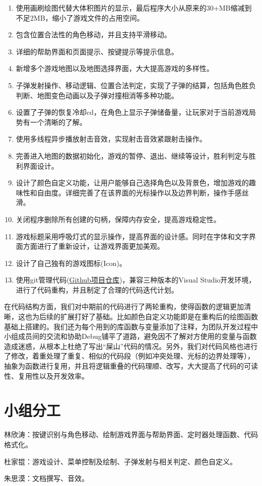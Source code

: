 \documentclass[lang=cn,11pt,a4paper]{elegantpaper}
\begin{document}
\begin{enumerate}
    \item 使用画刷绘图代替大体积图片的显示，最后程序大小从原来的30+MB缩减到不足2MB，缩小了游戏文件的占用空间。
    \item 包含位置合法性的角色移动，并且支持平滑移动。
    \item 详细的帮助界面和页面提示、按键提示等提示信息。
    \item 新增多个游戏地图以及地图选择界面，大大提高游戏的多样性。
    \item 子弹发射操作、移动逻辑、位置合法判定，实现了子弹的结算，包括角色胜负判断、地图变色动画以及子弹对撞相消等多种功能。
    \item 设置了子弹的恢复冷却cd，在角色上显示子弹储备量，让玩家对于当前游戏局势有一个清晰的了解。
    \item 使用多线程异步播放射击音效，实现射击音效紧跟射击操作。
    \item 完善进入地图的数据初始化，游戏的暂停、退出、继续等设计，胜利判定与胜利界面设计。
    \item 设计了颜色自定义功能，让用户能够自己选择角色以及背景色，增加游戏的趣味性和自由度。详细完善了在该界面的光标操作以及边界判断，操作手感丝滑。
    \item 关闭程序删除所有创建的句柄，保障内存安全，提高游戏稳定性。
    \item 游戏标题采用呼吸灯式的显示操作，提高界面的设计感。同时在字体和文字界面方面进行了重新设计，让游戏界面更加美观。
    \item 设计了自己独有的游戏图标(Icon)。
    \item 使用git管理代码(\href{https://github.com/linxt20/-INVERSUS_masm}{Github项目仓库})，兼容三种版本的Visual Studio开发环境，进行了代码重构，并且制定了合理的代码迭代计划。
\end{enumerate}
	
在代码结构方面，我们对中期前的代码进行了两轮重构，使得函数的逻辑更加清晰，这也为后续的扩展打好了基础。比如颜色自定义功能即是在重构后的绘图函数基础上搭建的。我们还为每个用到的库函数与变量添加了注释，为团队开发过程中小组成员间的交流和协助Debug铺平了道路，避免因不了解对方使用的变量与函数造成迷惑，从根本上杜绝了写出“屎山”代码的情况。另外，我们对代码风格也进行了修改，着重处理了重复、相似的代码段（例如冲突处理、光标的边界处理等），抽象为函数进行复用，并且将逻辑重叠的代码理顺、改写，大大提高了代码的可读性、复用性以及开发效率。


\section{小组分工}
林欣涛：按键识别与角色移动、绘制游戏界面与帮助界面、定时器处理函数、代码格式化。

杜家锟：游戏设计、菜单控制及绘制、子弹发射与相关判定、颜色自定义。

朱思漠：文档撰写、音效。
\end{document}
